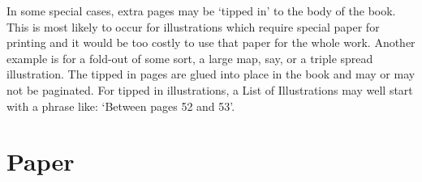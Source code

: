 \documentclass[10pt,a4paper,extrafontsizes]{memoir}
\begin{document}
\begin{paracol}{2}
    In some special cases, extra pages may be `tipped in' to
the body of the book. This is most likely to occur for 
illustrations which
require special paper for printing and it would be too costly to use
that paper for the whole work. Another example is for a fold-out of some sort,
a large map, say, or a triple spread illustration. The tipped in pages
are glued into place in the book and may or may not be paginated. For
tipped in illustrations, a List of Illustrations may well start with
a phrase like: `Between pages 52 and 53'.
\end{paracol}


\section{Paper}

\end{document}
